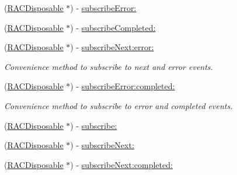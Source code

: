 \begin{DoxyCompactItemize}
(\mbox{\hyperlink{interface_r_a_c_disposable}{R\+A\+C\+Disposable}} $\ast$) -\/ \mbox{\hyperlink{category_r_a_c_signal_07_subscription_08_a6e792da9c8499ad5791e14bd126e99cb}{subscribe\+Error\+:}}
\item 
(\mbox{\hyperlink{interface_r_a_c_disposable}{R\+A\+C\+Disposable}} $\ast$) -\/ \mbox{\hyperlink{category_r_a_c_signal_07_subscription_08_a3927c94bfca5db9dad133dd7c45563f3}{subscribe\+Completed\+:}}
\item 
\mbox{\label{category_r_a_c_signal_07_subscription_08_a2fc221c95206c024d074a23cf7efc480}} 
(\mbox{\hyperlink{interface_r_a_c_disposable}{R\+A\+C\+Disposable}} $\ast$) -\/ \mbox{\hyperlink{category_r_a_c_signal_07_subscription_08_a2fc221c95206c024d074a23cf7efc480}{subscribe\+Next\+:error\+:}}
\begin{DoxyCompactList}\small\item\em Convenience method to subscribe to {\ttfamily next} and {\ttfamily error} events. \end{DoxyCompactList}\item 
\mbox{\label{category_r_a_c_signal_07_subscription_08_aad432a4ebbe885ea4bb606097a60e474}} 
(\mbox{\hyperlink{interface_r_a_c_disposable}{R\+A\+C\+Disposable}} $\ast$) -\/ \mbox{\hyperlink{category_r_a_c_signal_07_subscription_08_aad432a4ebbe885ea4bb606097a60e474}{subscribe\+Error\+:completed\+:}}
\begin{DoxyCompactList}\small\item\em Convenience method to subscribe to {\ttfamily error} and {\ttfamily completed} events. \end{DoxyCompactList}\item 
(\mbox{\hyperlink{interface_r_a_c_disposable}{R\+A\+C\+Disposable}} $\ast$) -\/ \mbox{\hyperlink{category_r_a_c_signal_07_subscription_08_aeab76d632d98bbc321ec5e19575377eb}{subscribe\+:}}
\item 
(\mbox{\hyperlink{interface_r_a_c_disposable}{R\+A\+C\+Disposable}} $\ast$) -\/ \mbox{\hyperlink{category_r_a_c_signal_07_subscription_08_a50d000f05e61411c438e616475deb7f8}{subscribe\+Next\+:}}
\item 
\mbox{\label{category_r_a_c_signal_07_subscription_08_afa988fdb4bcfe4d9b7b944879d163a52}} 
(\mbox{\hyperlink{interface_r_a_c_disposable}{R\+A\+C\+Disposable}} $\ast$) -\/ \mbox{\hyperlink{category_r_a_c_signal_07_subscription_08_afa988fdb4bcfe4d9b7b944879d163a52}{subscribe\+Next\+:completed\+:}}

\end{DoxyCompactItemize}
